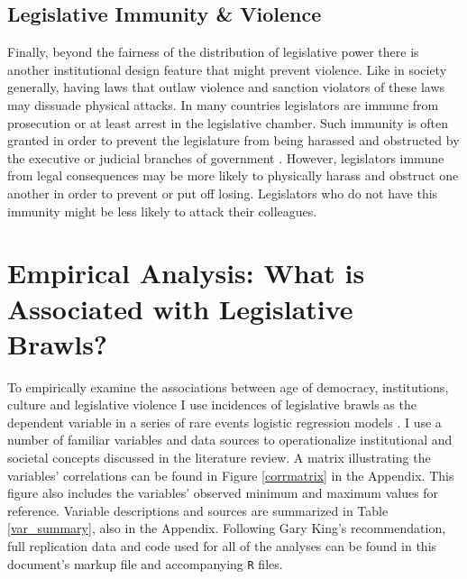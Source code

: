 \documentclass[a4paper]{article}\usepackage{graphicx, color}
\begin{document}
\subsection{Legislative Immunity \& Violence}

Finally, beyond the fairness of the distribution of legislative power there is another institutional design feature that might prevent violence. Like in society generally, having laws that outlaw violence and sanction violators of these laws may dissuade physical attacks. In many countries legislators are immune from prosecution or at least arrest in the legislative chamber. Such immunity is often granted in order to prevent the legislature from being harassed and obstructed by the executive or judicial branches of government  \citep{Seghetti1984}. However, legislators immune from legal consequences may be more likely to physically harass and obstruct one another in order to prevent or put off losing. Legislators who do not have this immunity might be less likely to attack their colleagues.

\section{Empirical Analysis: What is Associated with Legislative Brawls?}

To empirically examine the associations between age of democracy, institutions, culture and legislative violence I use incidences of legislative brawls as the dependent variable in a series of rare events logistic regression models \citep{KingRareEvents2001, KingRareEventsPA2001}. I use a number of familiar variables and data sources to operationalize institutional and societal concepts discussed in the literature review. A matrix illustrating the variables' correlations can be found in Figure \ref{corrmatrix} in the Appendix. This figure also includes the variables' observed minimum and maximum values for reference. Variable descriptions and sources are summarized in Table \ref{var_summary}, also in the Appendix. Following Gary King's \citeyearpar{King1995} recommendation, full replication data and code used for all of the analyses can be found in this document's markup file and accompanying {\tt{R}} files.
\end{document}
